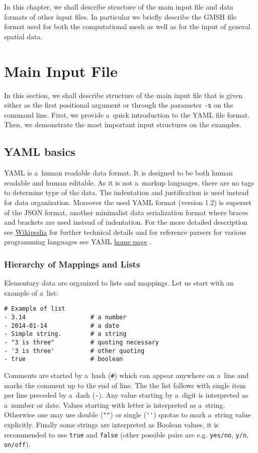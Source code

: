 
In this chapter, we shall describe structure of the main input file and data formats of other input files.
In particular we briefly describe the GMSH file format used for both the computational mesh as well as for the input of general spatial data.


\section{Main Input File}
\label{sec:CONformat}

In this section, we shall describe structure of the main input file that is given either as the first positional argument or through 
the parameter \verb'-s' on the command line. First, we provide a~quick introduction to the YAML file format. Then, we demonstrate the most important 
input structures on the examples. 







\subsection{YAML basics}
YAML is a~human readable data format. It is designed to be both human readable and human editable. As it is not a~markup languages, there are
no tags to determine type of the data. The indentation and justification is used instead for data organization. Moreover the used YAML format (version 1.2) is 
superset of the JSON format, another minimalist data serialization format where braces and brackets are used instead of indentation.
For the more detailed description see \href{https://en.wikipedia.org/wiki/YAML}{Wikipedia} 
for further technical details and for reference parsers for various programming languages see YAML \href{http://yaml.org/}{home page} .

\subsubsection{Hierarchy of Mappings and Lists}
Elementary data are organized to lists and mappings. Let us start with an example of a~list:
\begin{verbatim}
# Example of list 
- 3.14                  # a number
- 2014-01-14            # a date
- Simple string.        # a string
- "3 is three"          # quoting necessary
- '3 is three'          # other quoting
- true                  # boolean
\end{verbatim}
Comments are started by a~hash (\verb'#') which can appear anywhere on a~line and marks the comment up to the end of line.
The the list follows with single item per line preceded by a~dash (\verb'-'). Any value starting by a~digit is interpreted as a~number
or date. Values starting with letter is interpreted as a~string. Otherwise one may use double (\verb'""') or single (\verb"''") 
quotas to mark a~string value explicitly. Finally some strings are interpreted as Boolean values, it is recommended to use 
\verb'true' and \verb'false' (other possible pairs are e.g. \verb'yes/no', \verb'y/n', \verb'on/off'). 

